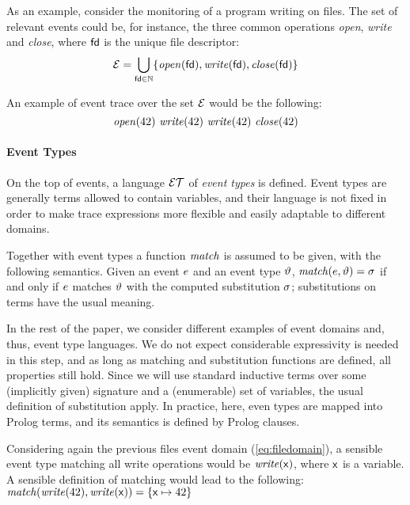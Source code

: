 As an example, consider the monitoring of a program writing on files.
The set of relevant events could be, for instance, the three common operations \emph{open}, \emph{write} and \emph{close}, where \(\mathsf{fd}\) is the unique file descriptor:
\begin{equation}\label{eq:filedomain}
\mathcal{E} = \bigcup_{\mathsf{fd} \in \mathbb{N}} \{\mathit{open}(\mathsf{fd}), \mathit{write}(\mathsf{fd}), \mathit{close}(\mathsf{fd})\}
\end{equation}

An example of event trace over the set \(\mathcal{E}\) would be the following:
\begin{equation} \label{eq:trace}
	\mathit{open}(42)\ \mathit{write}(42)\ \mathit{write}(42)\ \mathit{close}(42)
\end{equation}

\paragraph{Event Types}
On the top of events, a language \(\mathcal{ET}\) of \emph{event types} is defined.
Event types are generally terms allowed to contain variables, and their language is not fixed in order to make trace expressions more flexible and easily adaptable to different domains.

Together with event types a function \(\mathit{match}\) is assumed to be given, with the following semantics.
Given an event \(e\) and an event type \(\vartheta\), \(\mathit{match}(e, \vartheta) = \sigma\) if and only if \(e\) matches \(\vartheta\) with the computed substitution \(\sigma\); substitutions on terms have the usual meaning.

In the rest of the paper, we consider different examples of event domains and, thus, event type languages.
We do not expect considerable expressivity is needed in this step, and as long as matching and substitution functions are defined, all properties still hold.
Since we will use standard inductive terms over some (implicitly given) signature and a (enumerable) set of variables, the usual definition of substitution apply. In practice, here, even types are mapped into Prolog terms, and its semantics is defined by Prolog clauses.

Considering again the previous files event domain (\ref{eq:filedomain}), a sensible event type matching all write operations would be \(\mathit{write}(\mathsf{x})\), where \(\mathsf{x}\) is a variable.
A sensible definition of matching would lead to the following: $\mathit{match}(\mathit{write}(42), \mathit{write}(\mathsf{x})) = \{ \mathsf{x} \mapsto 42 \}$

